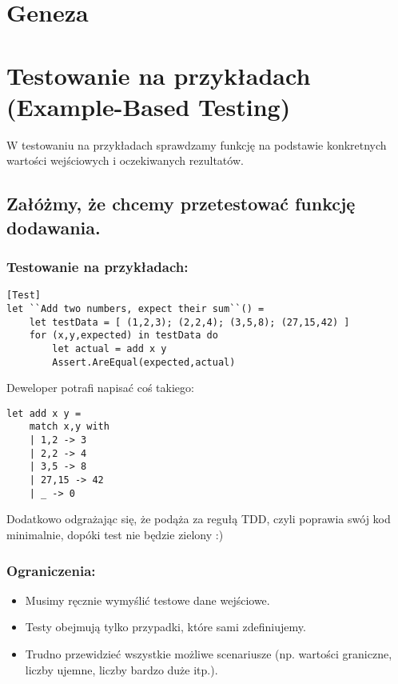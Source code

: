 \section{Geneza}

\section*{Testowanie na przykładach (Example-Based Testing)}

W testowaniu na przykładach sprawdzamy funkcję na podstawie konkretnych wartości wejściowych i oczekiwanych rezultatów.

\subsection*{Załóżmy, że chcemy przetestować funkcję dodawania.}

\subsubsection*{Testowanie na przykładach:}
\lstset{language=FSharp, basicstyle=\scriptsize}
\begin{lstlisting}[frame=single,caption={Testowanie na przykładach},label=kod:listingA]
[Test]
let ``Add two numbers, expect their sum``() =
    let testData = [ (1,2,3); (2,2,4); (3,5,8); (27,15,42) ]
    for (x,y,expected) in testData do
        let actual = add x y
        Assert.AreEqual(expected,actual)
\end{lstlisting}

Deweloper potrafi napisać coś takiego:
\lstset{language=FSharp, basicstyle=\scriptsize}
\begin{lstlisting}[frame=single,caption={Testowany kod},label=kod:listingA]
let add x y =
    match x,y with
    | 1,2 -> 3
    | 2,2 -> 4
    | 3,5 -> 8
    | 27,15 -> 42
    | _ -> 0
\end{lstlisting}

Dodatkowo odgrażając się, że podąża za regułą TDD, czyli poprawia swój kod minimalnie, dopóki test nie będzie zielony :)

\subsubsection*{Ograniczenia:}
\begin{itemize}
    \item Musimy ręcznie wymyślić testowe dane wejściowe.
    \item Testy obejmują tylko przypadki, które sami zdefiniujemy.
    \item Trudno przewidzieć wszystkie możliwe scenariusze (np. wartości graniczne, liczby ujemne, liczby bardzo duże itp.).
\end{itemize}

